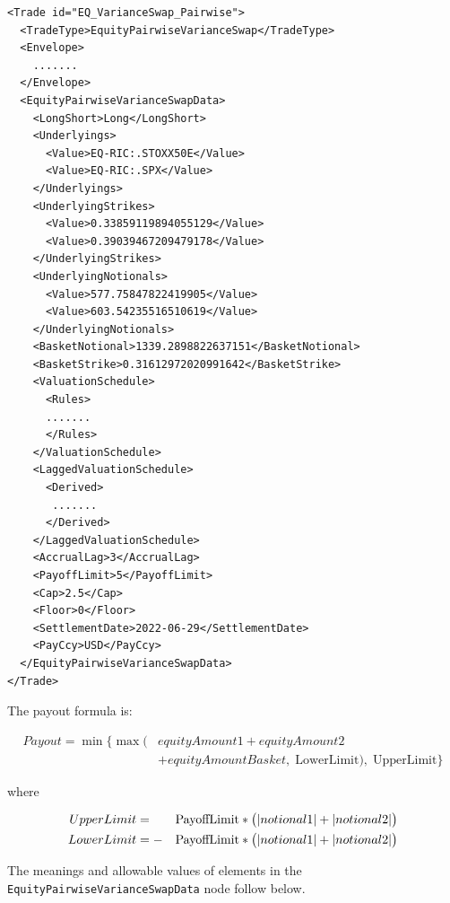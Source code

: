 \begin{listing}[H]
\begin{verbatim}
<Trade id="EQ_VarianceSwap_Pairwise">
  <TradeType>EquityPairwiseVarianceSwap</TradeType>
  <Envelope>
    .......
  </Envelope>
  <EquityPairwiseVarianceSwapData>
    <LongShort>Long</LongShort>
    <Underlyings>
      <Value>EQ-RIC:.STOXX50E</Value>
      <Value>EQ-RIC:.SPX</Value>
    </Underlyings>
    <UnderlyingStrikes>
      <Value>0.33859119894055129</Value>
      <Value>0.39039467209479178</Value>
    </UnderlyingStrikes>
    <UnderlyingNotionals>
      <Value>577.75847822419905</Value>
      <Value>603.54235516510619</Value>
    </UnderlyingNotionals>
    <BasketNotional>1339.2898822637151</BasketNotional>
    <BasketStrike>0.31612972020991642</BasketStrike>
    <ValuationSchedule>
      <Rules>
      .......
      </Rules>
    </ValuationSchedule>
    <LaggedValuationSchedule>
      <Derived>
       .......
      </Derived>
    </LaggedValuationSchedule>
    <AccrualLag>3</AccrualLag>
    <PayoffLimit>5</PayoffLimit>
    <Cap>2.5</Cap>
    <Floor>0</Floor>
    <SettlementDate>2022-06-29</SettlementDate>
    <PayCcy>USD</PayCcy>
  </EquityPairwiseVarianceSwapData>
</Trade>
\end{verbatim}
\caption{EquityPairwiseVarianceSwap data}
\label{lst:eqpairwisevarianceswap_data}
\end{listing}

The payout formula is:

\begin{equation*}
\begin{split}
Payout = \min \Big\{ \max \big( & equityAmount1 + equityAmount2 \\
& + equityAmountBasket,\; \text{LowerLimit} \big),\; \text{UpperLimit} \Big\}
\end{split}
\end{equation*}

where

\begin{align*}
  UpperLimit &= &&\text{\lstinline!PayoffLimit!} * \big( |notional1| + |notional2| \big) \\
  LowerLimit &= - &&\text{\lstinline!PayoffLimit!} * \big( |notional1| + |notional2| \big)
\end{align*}

The meanings and allowable values of elements in the \lstinline!EquityPairwiseVarianceSwapData! node follow below.

